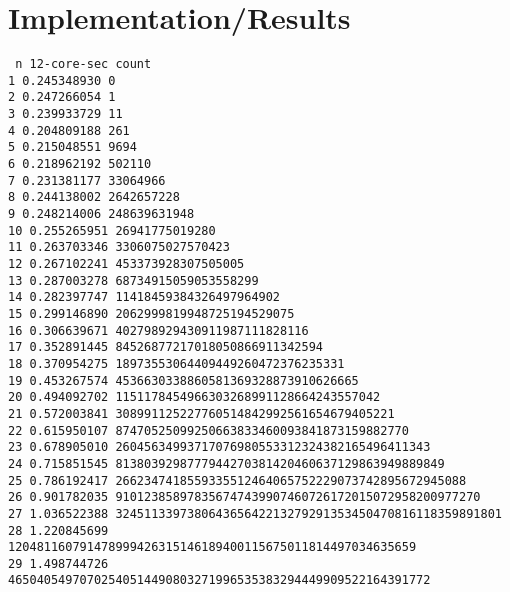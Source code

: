 \documentclass[10pt]{article}
\begin{document}
  \section{Implementation/Results}
  \tiny
  \texttt{
    n	12-core-sec	count\\
1	0.245348930	0\\
2	0.247266054	1\\
3	0.239933729	11\\
4	0.204809188	261\\
5	0.215048551	9694\\
6	0.218962192	502110\\
7	0.231381177	33064966\\
8	0.244138002	2642657228\\
9	0.248214006	248639631948\\
10	0.255265951	26941775019280\\
11	0.263703346	3306075027570423\\
12	0.267102241	453373928307505005\\
13	0.287003278	68734915059053558299\\
14	0.282397747	11418459384326497964902\\
15	0.299146890	2062999819948725194529075\\
16	0.306639671	402798929430911987111828116\\
17	0.352891445	84526877217018050866911342594\\
18	0.370954275	18973553064409449260472376235331\\
19	0.453267574	4536630338860581369328873910626665\\
20	0.494092702	1151178454966303268991128664243557042\\
21	0.572003841	308991125227760514842992561654679405221\\
22	0.615950107	87470525099250663833460093841873159882770\\
23	0.678905010	26045634993717076980553312324382165496411343\\
24	0.715851545	8138039298777944270381420460637129863949889849\\
25	0.786192417	2662347418559335512464065752229073742895672945088\\
26	0.901782035	910123858978356747439907460726172015072958200977270\\
27	1.036522388	324511339738064365642213279291353450470816118359891801\\
28	1.220845699	120481160791478999426315146189400115675011814497034635659\\
29	1.498744726	46504054970702540514490803271996535383294449909522164391772\\
}
\end{document}
